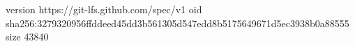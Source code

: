 version https://git-lfs.github.com/spec/v1
oid sha256:3279320956ffddeed45dd3b561305d547edd8b5175649671d5ec3938b0a88555
size 43840
